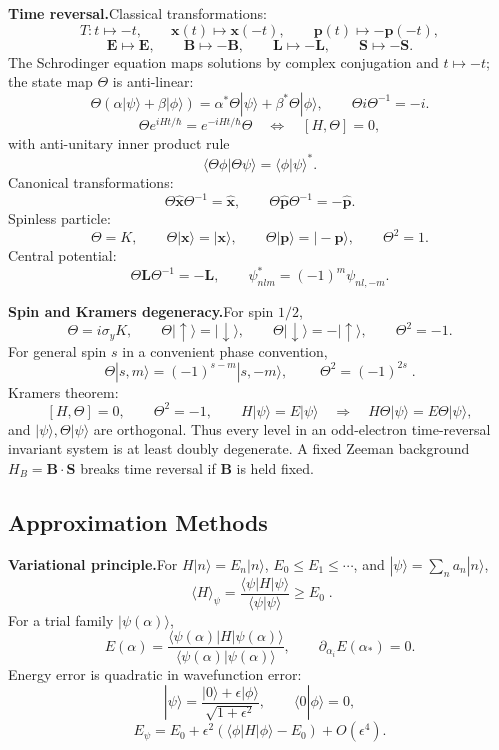 \noindent\textbf{Time reversal.}\quad Classical transformations:
\[
T:t\mapsto-t,\qquad
\mathbf x(t)\mapsto\mathbf x(-t),\qquad
\mathbf p(t)\mapsto-\mathbf p(-t),
\]
\[
\mathbf E\mapsto\mathbf E,\qquad
\mathbf B\mapsto-\mathbf B,\qquad
\mathbf L\mapsto-\mathbf L,\qquad
\mathbf S\mapsto-\mathbf S.
\]
The Schrodinger equation maps solutions by complex conjugation and $t\mapsto -t$;
the state map $\Theta$ is anti-linear:
\[
\Theta(\alpha|\psi\rangle+\beta|\phi\rangle)
=\alpha^*\Theta|\psi\rangle+\beta^*\Theta|\phi\rangle,\qquad
\Theta i\Theta^{-1}=-i.
\]
\[
\Theta e^{iHt/\hbar}=e^{-iHt/\hbar}\Theta
\quad\Longleftrightarrow\quad
[H,\Theta]=0,
\]
with anti-unitary inner product rule
\[
\langle\Theta\phi|\Theta\psi\rangle=\langle\phi|\psi\rangle^*.
\]
Canonical transformations:
\[
\Theta\hat{\mathbf x}\Theta^{-1}=\hat{\mathbf x},\qquad
\Theta\hat{\mathbf p}\Theta^{-1}=-\hat{\mathbf p}.
\]
Spinless particle:
\[
\Theta=K,\qquad
\Theta|\mathbf x\rangle=|\mathbf x\rangle,\qquad
\Theta|\mathbf p\rangle=|-\mathbf p\rangle,\qquad
\Theta^2=1.
\]
Central potential:
\[
\Theta\mathbf L\Theta^{-1}=-\mathbf L,\qquad
\psi_{nlm}^*=(-1)^m\psi_{nl,-m}.
\]

\noindent\textbf{Spin and Kramers degeneracy.}\quad For spin $1/2$,
\[
\Theta=i\sigma_yK,\qquad
\Theta|\uparrow\rangle=|\downarrow\rangle,\qquad
\Theta|\downarrow\rangle=-|\uparrow\rangle,\qquad
\Theta^2=-1.
\]
For general spin $s$ in a convenient phase convention,
\[
\Theta|s,m\rangle=(-1)^{s-m}|s,-m\rangle,\qquad
\boxed{\;\Theta^2=(-1)^{2s}\;}.
\]
Kramers theorem:
\[
[H,\Theta]=0,\qquad \Theta^2=-1,\qquad H|\psi\rangle=E|\psi\rangle
\quad\Longrightarrow\quad
H\Theta|\psi\rangle=E\Theta|\psi\rangle,
\]
and $|\psi\rangle,\Theta|\psi\rangle$ are orthogonal. Thus every level in an
odd-electron time-reversal invariant system is at least doubly degenerate. A fixed
Zeeman background $H_B=\mathbf B\cdot\mathbf S$ breaks time reversal if
$\mathbf B$ is held fixed.

\subsection{Approximation Methods}

\noindent\textbf{Variational principle.}\quad For $H|n\rangle=E_n|n\rangle$,
$E_0\le E_1\le\cdots$, and $|\psi\rangle=\sum_n a_n|n\rangle$,
\[
\boxed{\;\langle H\rangle_\psi=\frac{\langle\psi|H|\psi\rangle}
{\langle\psi|\psi\rangle}\ge E_0\;}.
\]
For a trial family $|\psi(\alpha)\rangle$,
\[
E(\alpha)=\frac{\langle\psi(\alpha)|H|\psi(\alpha)\rangle}
{\langle\psi(\alpha)|\psi(\alpha)\rangle},\qquad
\partial_{\alpha_i}E(\alpha_*)=0.
\]
Energy error is quadratic in wavefunction error:
\[
|\psi\rangle=\frac{|0\rangle+\epsilon|\phi\rangle}{\sqrt{1+\epsilon^2}},
\qquad \langle0|\phi\rangle=0,
\]
\[
E_\psi=E_0+\epsilon^2(\langle\phi|H|\phi\rangle-E_0)+O(\epsilon^4).
\]

